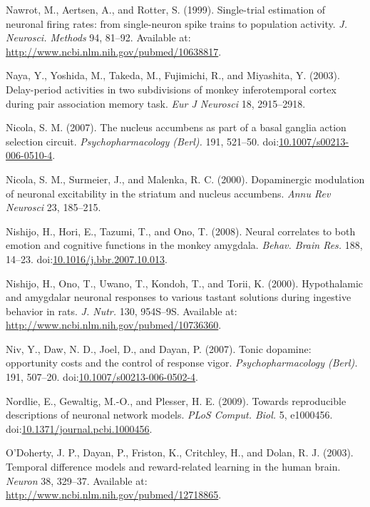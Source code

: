 \documentclass[
  11pt,
  a4paper,
]{scrbook}
\newlength{\cslhangindent}
\newenvironment{CSLReferences}[2] %
 {\begin{list}{}{%
  \setlength{\itemindent}{0pt}
  \setlength{\leftmargin}{0pt}
  \setlength{\parsep}{0pt}
  \ifodd #1
   \setlength{\leftmargin}{\cslhangindent}
   \setlength{\itemindent}{-1\cslhangindent}
  \fi
  \setlength{\itemsep}{#2\baselineskip}}}
 {\end{list}}
\begin{document}
\begin{CSLReferences}{1}{1}
Nawrot, M., Aertsen, A., and Rotter, S. (1999). {Single-trial estimation
of neuronal firing rates: from single-neuron spike trains to population
activity.} \emph{J. Neurosci. Methods} 94, 81--92. Available at:
\url{http://www.ncbi.nlm.nih.gov/pubmed/10638817}.

Naya, Y., Yoshida, M., Takeda, M., Fujimichi, R., and Miyashita, Y.
(2003). Delay-period activities in two subdivisions of monkey
inferotemporal cortex during pair association memory task. \emph{Eur J
Neurosci} 18, 2915--2918.

Nicola, S. M. (2007). {The nucleus accumbens as part of a basal ganglia
action selection circuit.} \emph{Psychopharmacology (Berl).} 191,
521--50.
doi:\href{https://doi.org/10.1007/s00213-006-0510-4}{10.1007/s00213-006-0510-4}.

Nicola, S. M., Surmeier, J., and Malenka, R. C. (2000). Dopaminergic
modulation of neuronal excitability in the striatum and nucleus
accumbens. \emph{Annu Rev Neurosci} 23, 185--215.

Nishijo, H., Hori, E., Tazumi, T., and Ono, T. (2008). {Neural
correlates to both emotion and cognitive functions in the monkey
amygdala.} \emph{Behav. Brain Res.} 188, 14--23.
doi:\href{https://doi.org/10.1016/j.bbr.2007.10.013}{10.1016/j.bbr.2007.10.013}.

Nishijo, H., Ono, T., Uwano, T., Kondoh, T., and Torii, K. (2000).
{Hypothalamic and amygdalar neuronal responses to various tastant
solutions during ingestive behavior in rats.} \emph{J. Nutr.} 130,
954S--9S. Available at:
\url{http://www.ncbi.nlm.nih.gov/pubmed/10736360}.

Niv, Y., Daw, N. D., Joel, D., and Dayan, P. (2007). {Tonic dopamine:
opportunity costs and the control of response vigor.}
\emph{Psychopharmacology (Berl).} 191, 507--20.
doi:\href{https://doi.org/10.1007/s00213-006-0502-4}{10.1007/s00213-006-0502-4}.

Nordlie, E., Gewaltig, M.-O., and Plesser, H. E. (2009). {Towards
reproducible descriptions of neuronal network models.} \emph{PLoS
Comput. Biol.} 5, e1000456.
doi:\href{https://doi.org/10.1371/journal.pcbi.1000456}{10.1371/journal.pcbi.1000456}.

O'Doherty, J. P., Dayan, P., Friston, K., Critchley, H., and Dolan, R.
J. (2003). {Temporal difference models and reward-related learning in
the human brain.} \emph{Neuron} 38, 329--37. Available at:
\url{http://www.ncbi.nlm.nih.gov/pubmed/12718865}.


\end{CSLReferences}
\end{document}
